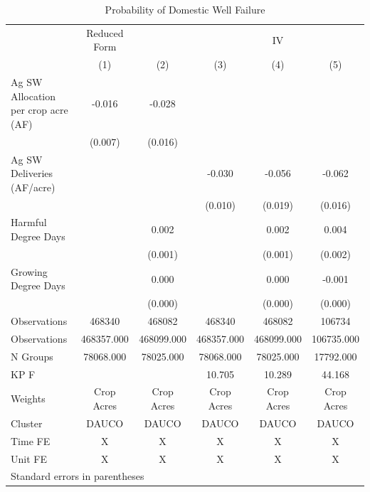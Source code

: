\begin{table}[htbp]\centering
\caption{Probability of Domestic Well Failure}
\begin{tabular}{l*{5}{c}}
\hline\hline
                    &Reduced Form&            &            &          IV&            \\
                    &\multicolumn{1}{c}{(1)}&\multicolumn{1}{c}{(2)}&\multicolumn{1}{c}{(3)}&\multicolumn{1}{c}{(4)}&\multicolumn{1}{c}{(5)}\\
\hline
Ag SW Allocation per crop acre (AF)&      -0.016&      -0.028&            &            &            \\
                    &     (0.007)&     (0.016)&            &            &            \\
[1em]
Ag SW Deliveries (AF/acre)&            &            &      -0.030&      -0.056&      -0.062\\
                    &            &            &     (0.010)&     (0.019)&     (0.016)\\
[1em]
Harmful Degree Days &            &       0.002&            &       0.002&       0.004\\
                    &            &     (0.001)&            &     (0.001)&     (0.002)\\
[1em]
Growing Degree Days &            &       0.000&            &       0.000&      -0.001\\
                    &            &     (0.000)&            &     (0.000)&     (0.000)\\
\hline
Observations        &      468340&      468082&      468340&      468082&      106734\\
Observations        &  468357.000&  468099.000&  468357.000&  468099.000&  106735.000\\
N Groups            &   78068.000&   78025.000&   78068.000&   78025.000&   17792.000\\
KP F                &            &            &      10.705&      10.289&      44.168\\
Weights             &  Crop Acres&  Crop Acres&  Crop Acres&  Crop Acres&  Crop Acres\\
Cluster             &       DAUCO&       DAUCO&       DAUCO&       DAUCO&       DAUCO\\
Time FE             &           X&           X&           X&           X&           X\\
Unit FE             &           X&           X&           X&           X&           X\\
\hline\hline
\multicolumn{6}{l}{\footnotesize Standard errors in parentheses}\\
\end{tabular}
\end{table}
